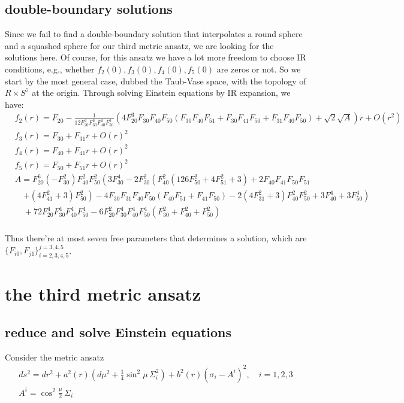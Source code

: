 \documentclass[12pt, a4paper]{article}
\numberwithin{equation}{section}
\newcommand{\be}{\begin{equation}}
\newcommand{\ee}{\end{equation}}
\begin{document}
\subsection{double-boundary solutions}
Since we fail to find a double-boundary solution that interpolates a round sphere and a squashed sphere for our third metric ansatz, we are looking for the solutions here. Of course, for this ansatz we have a lot more freedom to choose IR conditions, e.g., whether $f_2(0), f_3(0), f_4(0), f_5(0)$ are zeros or not. So we start by the most general case, dubbed the Taub-Vase space, with the topology of $R\times S^7$ at the origin. Through solving Einstein equations by IR expansion, we have:
\be
\begin{aligned}
	&f_2(r) = F_{20}-\frac{1}{12 F_{20}^2
		F_{30}^2 F_{40}^2 F_{50}^2}\left(4 F_{20}^3 F_{30} F_{40} F_{50} (F_{30} F_{40}
		F_{51}+F_{30} F_{41} F_{50}+F_{31} F_{40} F_{50}) +\sqrt{2}
		\sqrt{A}\right) r + O(r^2)&\\
	&f_3(r) = F_{30} + F_{31}r + O(r)^2&\\
	&f_4(r) = F_{40} + F_{41}r + O(r)^2&\\
	&f_5(r) = F_{50} + F_{51}r + O(r)^2&\\
		&A = F_{20}^6 \left(-F_{30}^2\right) F_{40}^2 F_{50}^2 \left(3 F_{30}^4-2
	F_{30}^2 \left(F_{40}^2 \left(126 F_{50}^2+4 F_{51}^2+3\right)+2
	F_{40} F_{41} F_{50} F_{51}\right.\right.&\\
	&\quad \left.\left.+\left(4 F_{41}^2+3\right)
	F_{50}^2\right)-4 F_{30} F_{31} F_{40} F_{50} (F_{40}
	F_{51}+F_{41} F_{50})-2 \left(4 F_{31}^2+3\right) F_{40}^2
	F_{50}^2+3 F_{40}^4+3 F_{50}^4\right)& \\ 
	&\quad +72 F_{20}^4 F_{30}^4
	F_{40}^4 F_{50}^4-6 F_{20}^2 F_{30}^4 F_{40}^4 F_{50}^4
	\left(F_{30}^2+F_{40}^2+F_{50}^2\right)&	\\
\end{aligned}
\ee

	Thus there're at most seven free parameters that determines a solution, which are $\{F_{i0},F_{j1}\}_{i=2,3,4,5}^{j=3,4,5}$.
		
\section{the third metric ansatz}
\subsection{reduce and solve Einstein equations}
	Consider the metric ansatz
\be
	\begin{aligned}
		&ds^2 = dr^2 + a^2(r) \left(d\mu^2 + \frac{1}{4}\sin^2\mu \,\Sigma_i^2\right) + b^2(r) (\sigma_i - A^i)^2 ,\quad i = 1,2,3&\\
		&A^i = \cos^2\frac{\mu}{2}\, \Sigma_i&\\
	\end{aligned}
\ee
\end{document}
